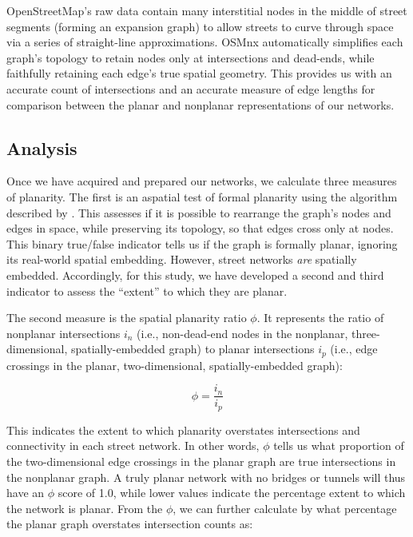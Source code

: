 \documentclass[Afour,sageh,times]{sagej}
\begin{document}
OpenStreetMap's raw data contain many interstitial nodes in the middle of street segments (forming an expansion graph) to allow streets to curve through space via a series of straight-line approximations. OSMnx automatically simplifies each graph's topology to retain nodes only at intersections and dead-ends, while faithfully retaining each edge's true spatial geometry. This provides us with an accurate count of intersections and an accurate measure of edge lengths for comparison between the planar and nonplanar representations of our networks.

\subsection{Analysis}

Once we have acquired and prepared our networks, we calculate three measures of planarity. The first is an aspatial test of formal planarity using the algorithm described by \citet{boyer_subgraph_2012}. This assesses if it is possible to rearrange the graph's nodes and edges in space, while preserving its topology, so that edges cross only at nodes. This binary true/false indicator tells us if the graph is formally planar, ignoring its real-world spatial embedding. However, street networks \emph{are} spatially embedded. Accordingly, for this study, we have developed a second and third indicator to assess the \enquote{extent} to which they are planar.

The second measure is the spatial planarity ratio $\phi$. It represents the ratio of nonplanar intersections $i_n$ (i.e., non-dead-end nodes in the nonplanar, three-dimensional, spatially-embedded graph) to planar intersections $i_p$ (i.e., edge crossings in the planar, two-dimensional, spatially-embedded graph): 

\begin{equation}
	\label{eq:spr}
	\phi = \frac{i_n}{i_p}
\end{equation}

This indicates the extent to which planarity overstates intersections and connectivity in each street network. In other words, $\phi$ tells us what proportion of the two-dimensional edge crossings in the planar graph are true intersections in the nonplanar graph. A truly planar network with no bridges or tunnels will thus have an $\phi$ score of 1.0, while lower values indicate the percentage extent to which the network is planar. From the $\phi$, we can further calculate by what percentage the planar graph overstates intersection counts as:
\end{document}
